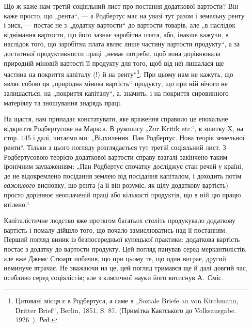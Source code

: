 Що ж каже нам третій соціяльний лист про постання додаткової
вартости? Він каже просто, що „рента“, — а Родбертус має на увазі тут
разом і земельну ренту і зиск, — постає не з „додатку вартости“ до
вартости товарів, але „в наслідок віднімання вартости, що його зазнає заробітна
плата, або, інакше кажучи, в наслідок того, що заробітна плата
являє лише частину вартости продукту“, а за достатньої продуктивности
праці „немає потреби, щоб вона дорівнювала природній міновій вартості
її продукту для того, щоб від неї лишалася ще частина на покриття
капіталу (!) й на ренту“\footnote*{
Цитовані місця є в Родбертуса, а саме в „Soziale Briefe an von Kirchmann,
Dritter Brief“, Berlin, 1851, S. 87. (Примітка Кавтського до Volksausgabe. 1926~).
\emph{Ред.}
}. При цьому нам не кажуть, що являє собою
ця „природна мінова вартість“ продукту, що при ній нічого не залишається,
на „покриття капіталу“, а, значить, і на покриття сировинного
матеріялу та зношування знарядь праці.

На щастя, нам припадає констатувати, яке враження справило це епохальне
відкриття Родбертусове на Маркса. В рукопису „Zur Kritik etc.“, в зшитку X,
на стор. 445 і далі, читаємо ми: „Відхилення. Пан Родбертус. Нова теорія
земельної ренти“. Тільки з цього погляду розглядається тут третій соціяльний
лист. З Родбертусовою теорією додаткової вартости справу взагалі
закінчено таким іронічним зауваженням: „Пан Родбертус спочатку досліджує
стан речей у країні, де не відокремлено посідання землею від посідання
капіталом, і доходить потім \emph{важливого} висновку, що рента (а її
він розуміє, як цілу додаткову вартість) просто дорівнює неоплаченій
праці або кількості продуктів, що в ній цю працю втілено.“

Капіталістичне людство вже протягом багатьох століть продукувало
додаткову вартість і помалу дійшло того, що почало замислюватись над
її постанням. Перший погляд виник із безпосередньої купецької
практики: додаткова вартість постає з додатку до вартости продукту.
Цей погляд панував серед меркантилістів, але вже Джемс Стюарт побачив,
що при цьому те, що один виграє, другий неминуче втрачає. Не зважаючи
на це, цей погляд тримався ще й далі довгий час, особливо серед
соціялістів; але з клясичної науки його витиснув А.~Сміс.


